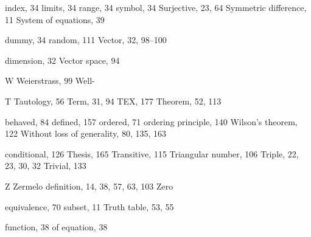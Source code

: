 \documentclass[11pt]{article}
\theoremstyle{plain}
\theoremstyle{definition}
\begin{document}
index, 34 limits, 34 range, 34 symbol, 34 Surjective, 23, 64 Symmetric difference, 11 System of equations, 39

dummy, 34 random, 111 Vector, 32, 98--100

dimension, 32 Vector space, 94

W Weierstrass, 99 Well-

T Tautology, 56 Term, 31, 94 TEX, 177 Theorem, 52, 113

behaved, 84 defined, 157 ordered, 71 ordering principle, 140 Wilson's theorem, 122 Without loss of generality, 80, 135, 163

conditional, 126 Thesis, 165 Transitive, 115 Triangular number, 106 Triple, 22, 23, 30, 32 Trivial, 133

Z Zermelo definition, 14, 38, 57, 63, 103 Zero

equivalence, 70 subset, 11 Truth table, 53, 55

function, 38 of equation, 38
\end{document}
